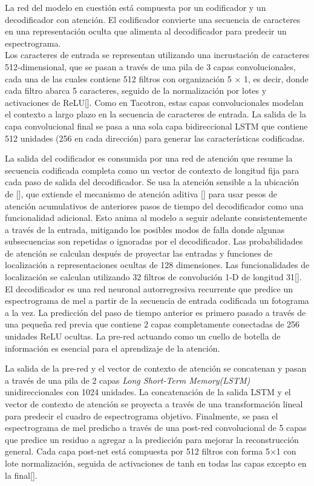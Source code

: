 La red del modelo en cuestión está compuesta por un codificador y un decodificador con atención. El codificador convierte una secuencia de caracteres en una representación oculta que alimenta al decodificador para predecir un espectrograma.\\  

Los caracteres de entrada se representan utilizando una incrustación de caracteres 512-dimensional, que se pasan a través de una pila de 3 capas convolucionales, cada una de las cuales contiene 512 filtros con organización 5 × 1, es decir, donde cada filtro abarca 5 caracteres, seguido de la normalización por lotes y activaciones de ReLU[\cite{shen2018natural}]. Como en Tacotron, estas capas convolucionales modelan el contexto a largo plazo en la secuencia de caracteres de entrada. La salida de la capa convolucional final se pasa a una sola capa bidireccional LSTM que contiene 512 unidades (256 en cada dirección) para generar las características codificadas.

La salida del codificador es consumida por una red de atención que resume la secuencia codificada completa como un vector de contexto de longitud fija para cada paso de salida del decodificador. Se usa la atención sensible a la ubicación de [\cite{chorowski2015attention}], que extiende el mecanismo de atención aditiva [\cite{bahdanau2014neural}] para usar pesos de atención acumulativos de anteriores pasos de tiempo del decodificador como una funcionalidad adicional. Esto anima al modelo a seguir adelante consistentemente a través de la entrada, mitigando los posibles modos de falla donde algunas subsecuencias son repetidas o ignoradas por el decodificador.
Las probabilidades de atención se calculan después de proyectar las entradas y funciones de localización a representaciones ocultas de 128 dimensiones. Las funcionalidades de localización se calculan utilizando 32 filtros de convolución 1-D de longitud 31[\cite{shen2018natural}]. \\

El decodificador es una red neuronal autorregresiva recurrente que predice un espectrograma de mel a partir de la secuencia de entrada codificada un fotograma a la vez. La predicción del paso de tiempo anterior es primero pasado a través de una pequeña red previa que contiene 2 capas completamente conectadas de 256 unidades ReLU ocultas. La pre-red actuando como un cuello de botella de información es esencial para el aprendizaje de la atención.

La salida de la pre-red y el vector de contexto de atención se concatenan y pasan a través de una pila de 2 capas \textit{Long Short-Term Memory(LSTM)} unidireccionales con 1024 unidades. La concatenación de la salida LSTM y el vector de contexto de atención se proyecta a través de una transformación lineal para predecir el cuadro de espectrograma objetivo. Finalmente, se pasa el espectrograma de mel predicho a través de una post-red convolucional de 5 capas que predice un residuo a agregar a la predicción para mejorar la reconstrucción general. Cada capa post-net está compuesta por 512 filtros con forma 5×1 con lote normalización, seguida de activaciones de tanh en todas las capas excepto en la final[\cite{shen2018natural}].\\


